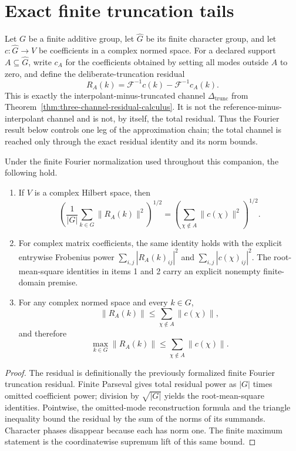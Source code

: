 \section{Exact finite truncation tails}
\label{sec:finite-truncation-tails}

Let $G$ be a finite additive group, let $\widehat G$ be its finite character group, and
let $c:\widehat G\to V$ be coefficients in a complex normed space.  For a declared
support $A\subseteq\widehat G$, write $c_A$ for the coefficients obtained by setting
all modes outside $A$ to zero, and define the deliberate-truncation residual
\[
  R_A(k)=\mathcal F^{-1}c(k)-\mathcal F^{-1}c_A(k).
\]
This is exactly the interpolant-minus-truncated channel
$\Delta_{\mathrm{trunc}}$ from
Theorem~\ref{thm:three-channel-residual-calculus}.  It is not the
reference-minus-interpolant channel and is not, by itself, the total residual.  Thus the
Fourier result below controls one leg of the approximation chain; the total channel is
reached only through the exact residual identity and its norm bounds.

\begin{theorem}
\label{thm:finite-fourier-tail-bounds}
Under the finite Fourier normalization used throughout this companion, the following
hold.
\begin{enumerate}
  \item If $V$ is a complex Hilbert space, then
  \[
    \left(\frac1{|G|}\sum_{k\in G}\lVert R_A(k)\rVert^2\right)^{1/2}
    =\left(\sum_{\chi\notin A}\lVert c(\chi)\rVert^2\right)^{1/2}.
  \]
  \item For complex matrix coefficients, the same identity holds with the explicit
  entrywise Frobenius power
  $\sum_{i,j}|R_A(k)_{ij}|^2$ and
  $\sum_{i,j}|c(\chi)_{ij}|^2$. The root-mean-square identities in items 1 and 2 carry
  an explicit nonempty finite-domain premise.
  \item For any complex normed space and every $k\in G$,
  \[
    \lVert R_A(k)\rVert
    \leq \sum_{\chi\notin A}\lVert c(\chi)\rVert,
  \]
  and therefore
  \[
    \max_{k\in G}\lVert R_A(k)\rVert
    \leq \sum_{\chi\notin A}\lVert c(\chi)\rVert.
  \]
\end{enumerate}
\end{theorem}

\begin{proof}
The residual is definitionally the previously formalized finite Fourier truncation
residual.  Finite Parseval gives total residual power as $|G|$ times omitted coefficient
power; division by $\sqrt{|G|}$ yields the root-mean-square identities.  Pointwise, the
omitted-mode reconstruction formula and the triangle inequality bound the residual by
the sum of the norms of its summands.  Character phases disappear because each has norm
one. The finite maximum statement is the coordinatewise supremum lift of this same
bound.
\end{proof}

